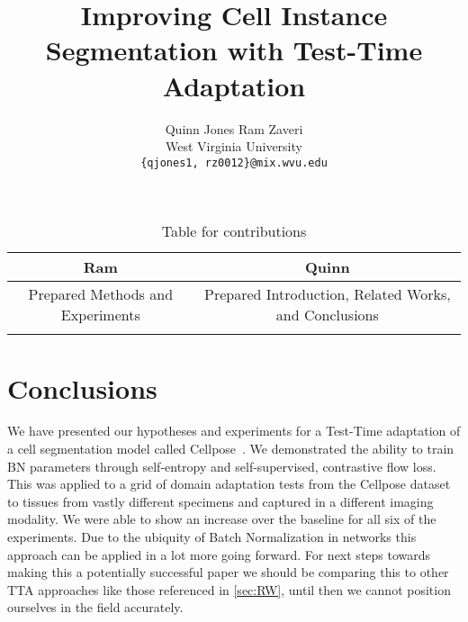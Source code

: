 \documentclass[10pt,twocolumn,letterpaper]{article}
\author{Quinn Jones \qquad Ram Zaveri \\
West Virginia University\\
{\tt\small \{qjones1, rz0012\}@mix.wvu.edu}
}
\begin{document}
\begin{table}[h]
\centering
\begin{tabular}{|c|c|}
\hline
\textbf{Ram} & \textbf{Quinn} \\ \hline
 Prepared Methods and Experiments   & 
 Prepared Introduction, Related Works, and Conclusions
\\ \hline
 &   \\
 \hline
\end{tabular}
\caption{Table for contributions}
\label{tab:ram_quinn}
\end{table}


\pagebreak\pagebreak
\title{Improving Cell Instance Segmentation with Test-Time Adaptation}
\maketitle
    





\section{Conclusions}
We have presented our hypotheses and experiments for a Test-Time adaptation of a cell segmentation model called Cellpose~\cite{stringer2021cellpose}. We demonstrated the ability to train BN parameters through self-entropy and self-supervised, contrastive flow loss.  This was applied to a grid of domain adaptation tests from the Cellpose dataset to tissues from vastly different specimens and captured in a different imaging modality. We were able to show an increase over the baseline for all six of the experiments.   Due to the ubiquity of Batch Normalization in networks this approach can be applied in a lot more going forward.  For next steps towards making this a potentially successful paper we should be comparing this to other TTA approaches like those referenced in \ref{sec:RW}, until then we cannot position ourselves in the field accurately. 


{
    \small
    
    
}

% 
\end{document}
